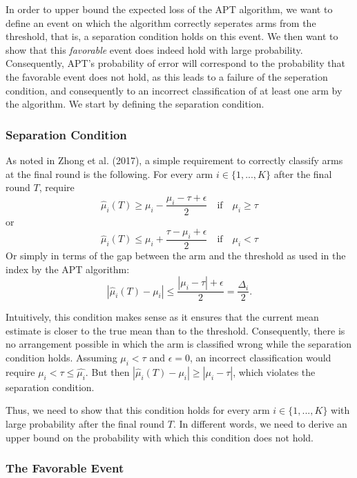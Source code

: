 \documentclass[11pt,]{article}
\begin{document}
In order to upper bound the expected loss of the APT algorithm, we want
to define an event on which the algorithm correctly seperates arms from
the threshold, that is, a separation condition holds on this event. We
then want to show that this \emph{favorable} event does indeed hold with
large probability. Consequently, APT's probability of error will
correspond to the probability that the favorable event does not hold, as
this leads to a failure of the seperation condition, and consequently to
an incorrect classification of at least one arm by the algorithm. We
start by defining the separation condition.

\subsubsection{Separation Condition}\label{separation-condition}

As noted in Zhong et al. (2017), a simple requirement to correctly
classify arms at the final round is the following. For every arm
\(i \in \{1, ..., K\}\) after the final round \(T\), require \[
\hat{\mu}_{i}(T) \geq \mu_i - \frac{\mu_i - \tau + \epsilon}{2} \quad \text{if} \quad \mu_i \geq \tau
\] or \[
\hat{\mu}_{i}(T) \leq \mu_i + \frac{\tau - \mu_i + \epsilon}{2} \quad \text{if} \quad \mu_i < \tau
\] Or simply in terms of the gap between the arm and the threshold as
used in the index by the APT algorithm: \[
| \hat{\mu}_{i}(T) - \mu_i | \leq \frac{|\mu_i - \tau| + \epsilon}{2} = \frac{\Delta_i}{2}.
\]

Intuitively, this condition makes sense as it ensures that the current
mean estimate is closer to the true mean than to the threshold.
Consequently, there is no arrangement possible in which the arm is
classified wrong while the separation condition holds. Assuming
\(\mu_i < \tau\) and \(\epsilon = 0\), an incorrect classification would
require \(\mu_i < \tau \leq \hat{\mu_i}\). But then
\(| \hat{\mu}_{i}(T) - \mu_i | \geq |\mu_i - \tau|\), which violates the
separation condition.

Thus, we need to show that this condition holds for every arm
\(i \in \{1,...,K\}\) with large probability after the final round
\(T\). In different words, we need to derive an upper bound on the
probability with which this condition does not hold.

\subsubsection{The Favorable Event}\label{the-favorable-event}
\end{document}
